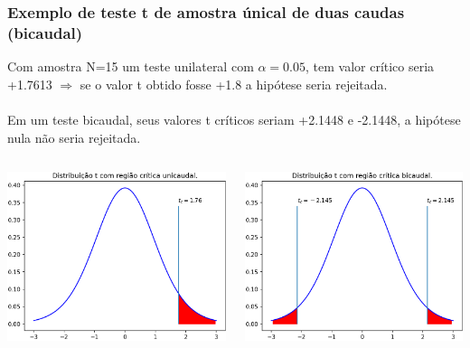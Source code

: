 \documentclass[11pt]{beamer}
\begin{document}
\begin{frame}
\frametitle{Exemplo de teste t de amostra únical de duas caudas (bicaudal)}
Com amostra  N=15 um teste unilateral com $\alpha = 0.05$, tem valor crítico seria +1.7613 \(\Rightarrow\) se o valor t obtido fosse +1.8 a hipótese seria rejeitada. \\~\\
Em um teste bicaudal, seus valores t críticos seriam +2.1448 e -2.1448, a hipótese nula não seria rejeitada.
\begin{columns}
\begin{column}{0.5\textwidth}
   \includegraphics[width=1\linewidth]{figs/regiao_critica_unicaudal_t}
\end{column}
\begin{column}{0.5\textwidth}  %
   \includegraphics[width=1\linewidth]{figs/regiao_critica_bicaudal_t}
\end{column}
\end{columns}
\end{frame}
\end{document}
